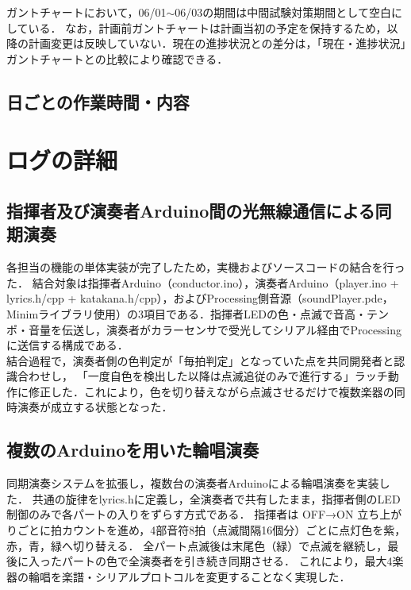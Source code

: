 \documentclass[lualatex,paper=a4paper,jafontsize=11.5pt,jafontscale=1.05]{jlreq}
\begin{document}
ガントチャートにおいて，06/01$\sim$06/03の期間は中間試験対策期間として空白にしている．
なお，計画前ガントチャートは計画当初の予定を保持するため，以降の計画変更は反映していない．現在の進捗状況との差分は，「現在・進捗状況」ガントチャートとの比較により確認できる．

\subsection{日ごとの作業時間・内容}
\begin{table}[H]
  \centering
  \caption{日ごとの作業時間・内容}

\end{table}

\section{ログの詳細}

\subsection{指揮者及び演奏者Arduino間の光無線通信による同期演奏}
各担当の機能の単体実装が完了したため，実機およびソースコードの結合を行った．
結合対象は指揮者Arduino（conductor.ino），演奏者Arduino（player.ino + lyrics.h/cpp + katakana.h/cpp），およびProcessing\cite{processing}側音源（soundPlayer.pde，Minimライブラリ使用\cite{minim_unpatch}）の3項目である．指揮者LEDの色・点滅で音高・テンポ・音量を伝送し，演奏者がカラーセンサで受光してシリアル経由でProcessingに送信する構成である．\\
結合過程で，演奏者側の色判定が「毎拍判定」となっていた点を共同開発者と認識合わせし，
「一度自色を検出した以降は点滅追従のみで進行する」ラッチ動作に修正した．これにより，色を切り替えながら点滅させるだけで複数楽器の同時演奏が成立する状態となった．

\subsection{複数のArduinoを用いた輪唱演奏}
同期演奏システムを拡張し，複数台の演奏者Arduinoによる輪唱演奏を実装した．
共通の旋律をlyrics.hに定義し，全演奏者で共有したまま，指揮者側のLED制御のみで各パートの入りをずらす方式である．
指揮者は OFF→ON 立ち上がりごとに拍カウントを進め，4部音符8拍（点滅間隔16個分）ごとに点灯色を紫，赤，青，緑へ切り替える．
全パート点滅後は末尾色（緑）で点滅を継続し，最後に入ったパートの色で全演奏者を引き続き同期させる．
これにより，最大4楽器の輪唱を楽譜・シリアルプロトコルを変更することなく実現した．
\end{document}

